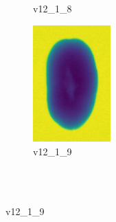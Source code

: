 \documentclass[11pt]{article}
\begin{document}
\begin{figure}
\begin{subfigure}[b]{0.15\textwidth}
        \caption{v12\_1\_8}
         \label{fig:five over x}
     \end{subfigure}
     \hfill
    \begin{subfigure}[b]{0.15\textwidth}
         \centering
         \includegraphics[width=3cm, height=4.5cm]{images/kartofler/v12_1_9_cut.png}
        \caption{v12\_1\_9}
         \label{fig:five over x}
     \end{subfigure} 
     
     
     \\ \\
     

\end{figure}
\end{document}
